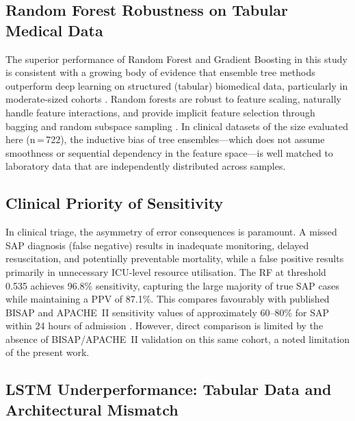 \documentclass[12pt,a4paper]{article}
\begin{document}
\subsection{Random Forest Robustness on Tabular Medical Data}

The superior performance of Random Forest and Gradient Boosting in this study is consistent with a growing body of evidence that ensemble tree methods outperform deep learning on structured (tabular) biomedical data, particularly in moderate-sized cohorts \citep{Grinsztajn2022, Shwartz2022}. Random forests are robust to feature scaling, naturally handle feature interactions, and provide implicit feature selection through bagging and random subspace sampling \citep{Breiman2001}. In clinical datasets of the size evaluated here (n\,=\,722), the inductive bias of tree ensembles—which does not assume smoothness or sequential dependency in the feature space—is well matched to laboratory data that are independently distributed across samples.

\subsection{Clinical Priority of Sensitivity}

In clinical triage, the asymmetry of error consequences is paramount. A missed SAP diagnosis (false negative) results in inadequate monitoring, delayed resuscitation, and potentially preventable mortality, while a false positive results primarily in unnecessary ICU-level resource utilisation. The RF at threshold 0.535 achieves 96.8\% sensitivity, capturing the large majority of true SAP cases while maintaining a PPV of 87.1\%. This compares favourably with published BISAP and APACHE~II sensitivity values of approximately 60--80\% for SAP within 24 hours of admission \citep{Papachristou2010, Wu2011}. However, direct comparison is limited by the absence of BISAP/APACHE~II validation on this same cohort, a noted limitation of the present work.

\subsection{LSTM Underperformance: Tabular Data and Architectural Mismatch}
\end{document}
